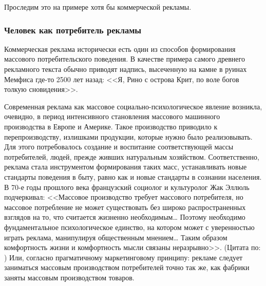 Проследим это на примере хотя бы коммерческой рекламы.

\subsubsection{Человек как потребитель рекламы}
\label{2.4}

Коммерческая реклама исторически есть один из способов формирования массового
потребительского поведения. В качестве примера самого древнего рекламного текста
обычно приводят надпись, высеченную на камне в руинах Мемфиса где-то 2500 лет
назад: <<Я, Рино с острова Крит, по воле богов толкую сновидения>>.\autocite{katernuk2001}

Современная реклама как массовое социально-психологическое явление возникла,
очевидно, в период интенсивного становления массового машинного производства в
Европе и Америке. Такое производство приводило к перепроизводству, излишками
продукции, которые нужно было реализовывать. Для этого потребовалось создание и
воспитание соответствующей массы потребителей, людей, прежде живших натуральным
хозяйством. Соответственно, реклама стала инструментом формирования таких масс,
устанавливать новые стандарты поведения в быту, равно как и новые стандарты в
сознании населения. В 70-е годы прошлого века французский социолог и культуролог
Жак Эллюль подчеркивал: <<Массовое производство требует массового потребителя,
но массовое потребление не может существовать без широко распространенных взглядов
на то, что считается жизненно необходимым\ldots
Поэтому необходимо фундаментальное психологическое единство, на котором может
с уверенностью играть реклама, манипулируя общественным мнением\ldots
Таким образом комфортность жизни и комфортность мысли связаны неразрывно>>.
(Цитата по: \autocite{golova}) Или, согласно прагматичному маркетинговому принципу:
рекламе следует заниматься массовым производством потребителей точно так же,
как фабрики заняты массовым производством товаров.

